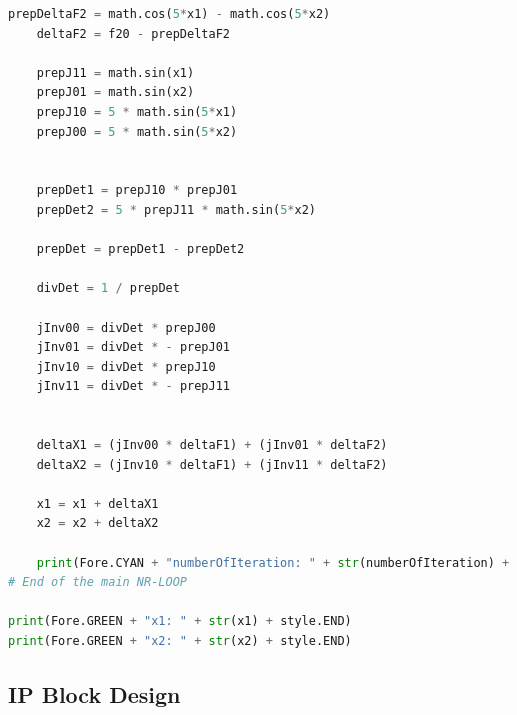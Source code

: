 \documentclass[a4paper, twoside, 11pt]{article}
\begin{document}
\begin{lstlisting}[language={python}, caption={Python implementation of the Selective Harmonic Elimination Algorithm with adjustable modulation index.}, label= {lst:she-python}]
    prepDeltaF2 = math.cos(5*x1) - math.cos(5*x2)
    deltaF2 = f20 - prepDeltaF2

    prepJ11 = math.sin(x1)
    prepJ01 = math.sin(x2)
    prepJ10 = 5 * math.sin(5*x1)
    prepJ00 = 5 * math.sin(5*x2)


    prepDet1 = prepJ10 * prepJ01
    prepDet2 = 5 * prepJ11 * math.sin(5*x2)

    prepDet = prepDet1 - prepDet2

    divDet = 1 / prepDet

    jInv00 = divDet * prepJ00
    jInv01 = divDet * - prepJ01
    jInv10 = divDet * prepJ10
    jInv11 = divDet * - prepJ11


    deltaX1 = (jInv00 * deltaF1) + (jInv01 * deltaF2)
    deltaX2 = (jInv10 * deltaF1) + (jInv11 * deltaF2)

    x1 = x1 + deltaX1
    x2 = x2 + deltaX2

    print(Fore.CYAN + "numberOfIteration: " + str(numberOfIteration) + style.END)
# End of the main NR-LOOP

print(Fore.GREEN + "x1: " + str(x1) + style.END)
print(Fore.GREEN + "x2: " + str(x2) + style.END)
\end{lstlisting}
    \subsection{IP Block Design}
\end{document}
